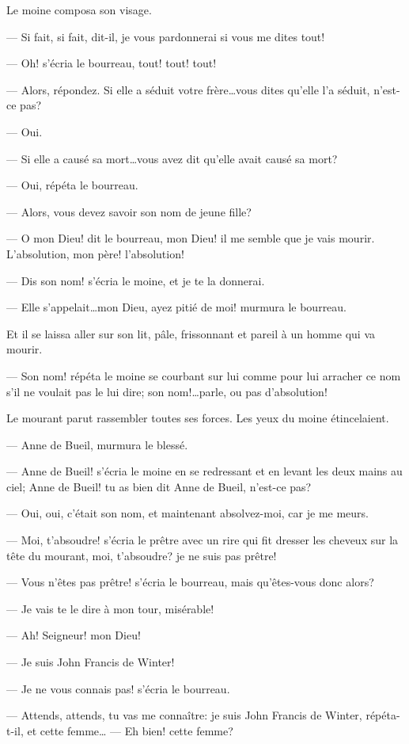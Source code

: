 Le moine composa son visage.

— Si fait, si fait, dit-il, je vous pardonnerai si vous me dites tout!

— Oh! s'écria le bourreau, tout! tout! tout!

— Alors, répondez. Si elle a séduit votre frère\dots vous dites qu'elle l'a séduit, n'est-ce pas?

— Oui.

— Si elle a causé sa mort\dots vous avez dit qu'elle avait causé sa mort?

— Oui, répéta le bourreau.

— Alors, vous devez savoir son nom de jeune fille?

— O mon Dieu! dit le bourreau, mon Dieu! il me semble que je vais mourir. L'absolution, mon père! l'absolution!

— Dis son nom! s'écria le moine, et je te la donnerai.

— Elle s'appelait\dots mon Dieu, ayez pitié de moi! murmura le bourreau.

Et il se laissa aller sur son lit, pâle, frissonnant et pareil à un homme qui va mourir.

— Son nom! répéta le moine se courbant sur lui comme pour lui arracher ce nom s'il ne voulait pas le lui dire; son nom!\dots parle, ou pas d'absolution!

Le mourant parut rassembler toutes ses forces. Les yeux du moine étincelaient.

— Anne de Bueil, murmura le blessé.

— Anne de Bueil! s'écria le moine en se redressant et en levant les deux mains au ciel; Anne de Bueil! tu as bien dit Anne de Bueil, n'est-ce pas?

— Oui, oui, c'était son nom, et maintenant absolvez-moi, car je me meurs.

— Moi, t'absoudre! s'écria le prêtre avec un rire qui fit dresser les cheveux sur la tête du mourant, moi, t'absoudre? je ne suis pas prêtre!

— Vous n'êtes pas prêtre! s'écria le bourreau, mais qu'êtes-vous donc alors?

— Je vais te le dire à mon tour, misérable!

— Ah! Seigneur! mon Dieu!

— Je suis John Francis de Winter!

— Je ne vous connais pas! s'écria le bourreau.

— Attends, attends, tu vas me connaître: je suis John Francis de Winter, répéta-t-il, et cette femme\dots
— Eh bien! cette femme?


